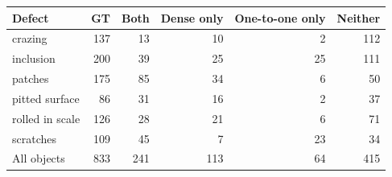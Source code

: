 \begin{tabular}{lrrrrr}
\hline
Defect & GT & Both & Dense only & One-to-one only & Neither \\
\hline
crazing & 137 & 13 & 10 & 2 & 112 \\
inclusion & 200 & 39 & 25 & 25 & 111 \\
patches & 175 & 85 & 34 & 6 & 50 \\
pitted surface & 86 & 31 & 16 & 2 & 37 \\
rolled in scale & 126 & 28 & 21 & 6 & 71 \\
scratches & 109 & 45 & 7 & 23 & 34 \\
\hline
All objects & 833 & 241 & 113 & 64 & 415 \\
\hline
\end{tabular}

